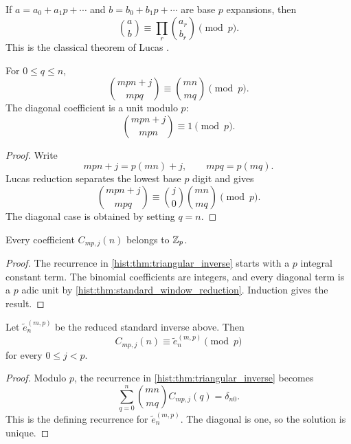 \begin{histstandardfact}\label{hist:fact:lucas}
If \(a=a_0+a_1p+\cdots\) and \(b=b_0+b_1p+\cdots\) are base \(p\) expansions, then
\[
\binom ab
\equiv
\prod_r\binom{a_r}{b_r}
\pmod p.
\]
This is the classical theorem of Lucas \cite{Lucas1878a}.
\end{histstandardfact}

\begin{histtheorem}\label{hist:thm:standard_window_reduction}
For \(0\leq q\leq n\),
\[
\boxed{
\binom{mpn+j}{mpq}
\equiv
\binom{mn}{mq}
\pmod p.
}
\]
The diagonal coefficient is a unit modulo \(p\):
\[
\binom{mpn+j}{mpn}
\equiv1
\pmod p.
\]
\end{histtheorem}

\begin{proof}
Write
\[
mpn+j=p(mn)+j,
\qquad
mpq=p(mq).
\]
Lucas reduction separates the lowest base \(p\) digit and gives
\[
\binom{mpn+j}{mpq}
\equiv
\binom j0
\binom{mn}{mq}
\pmod p.
\]
The diagonal case is obtained by setting \(q=n\).
\end{proof}

\begin{histcorollary}\label{hist:cor:standard_integrality}
Every coefficient \(C_{mp,j}(n)\) belongs to \(\mathbb Z_p\).
\end{histcorollary}

\begin{proof}
The recurrence in \cref{hist:thm:triangular_inverse} starts with a \(p\) integral constant term. The binomial coefficients are integers, and every diagonal term is a \(p\) adic unit by \cref{hist:thm:standard_window_reduction}. Induction gives the result.
\end{proof}

\begin{histcorollary}\label{hist:cor:address_independence}
Let \(\widetilde e_n^{(m,p)}\) be the reduced standard inverse above. Then
\[
\boxed{
C_{mp,j}(n)
\equiv
\widetilde e_n^{(m,p)}
\pmod p
}
\]
for every \(0\leq j<p\).
\end{histcorollary}

\begin{proof}
Modulo \(p\), the recurrence in \cref{hist:thm:triangular_inverse} becomes
\[
\sum_{q=0}^{n}
\binom{mn}{mq}
C_{mp,j}(q)
=
\delta_{n0}.
\]
This is the defining recurrence for \(\widetilde e_n^{(m,p)}\). The diagonal is one, so the solution is unique.
\end{proof}

